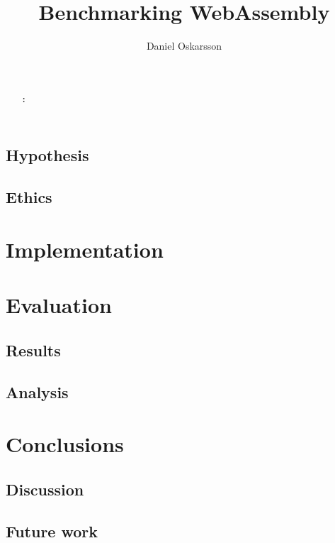 \documentclass[english,template=rapport]{his}
\title{Benchmarking WebAssembly}
\subtitle{}
\author{Daniel Oskarsson}
\begin{document}
\maketitle

\begin{abstract}
    \bigskip
    \normalsize
    \\
    \\
    \textbf{:} 
\end{abstract}

\clearpage
\tableofcontents
{}

\clearpage
{}


\clearpage


\clearpage


\subsection{Hypothesis}

\clearpage


\subsection{Ethics}

\section{Implementation}

\section{Evaluation}

\subsection{Results}

\subsection{Analysis}

\section{Conclusions}

\subsection{Discussion}

\subsection{Future work}

\clearpage
\printbibliography[heading=bibintoc]
\end{document}
